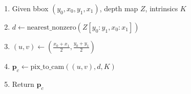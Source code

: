 \begin{enumerate}
    \item Given bbox $(y_0,x_0,y_1,x_1)$, depth map $Z$, intrinsics $K$
    \item $d \gets \text{nearest\_nonzero}(Z[y_0:y_1,x_0:x_1])$
    \item $(u,v) \gets (\tfrac{x_0+x_1}{2}, \tfrac{y_0+y_1}{2})$
    \item $\mathbf{p}_c \gets \text{pix\_to\_cam}((u,v), d, K)$
    \item Return $\mathbf{p}_c$
\end{enumerate}
